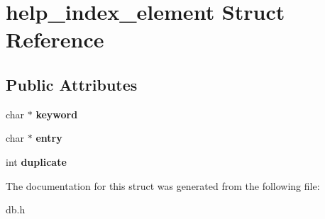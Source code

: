 \hypertarget{structhelp__index__element}{}\section{help\+\_\+index\+\_\+element Struct Reference}
\label{structhelp__index__element}
\subsection*{Public Attributes}
\begin{DoxyCompactItemize}
\item 
\mbox{\label{structhelp__index__element_aaaa468f8ca8b1251c296246b6e198a0b}} 
char $\ast$ {\bfseries keyword}
\item 
\mbox{\label{structhelp__index__element_a1d7be03eade7ad0064043cd40f5613bb}} 
char $\ast$ {\bfseries entry}
\item 
\mbox{\label{structhelp__index__element_ab8579374cba432245c2cee8e3b16bb92}} 
int {\bfseries duplicate}
\end{DoxyCompactItemize}


The documentation for this struct was generated from the following file\+:\begin{DoxyCompactItemize}
\item 
db.\+h\end{DoxyCompactItemize}
